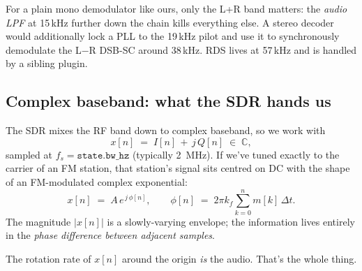 \documentclass[11pt,a4paper]{article}
\begin{document}
For a plain mono demodulator like ours, only the L+R band matters: the
\emph{audio LPF} at 15\,kHz further down the chain kills everything
else.  A stereo decoder would additionally lock a PLL to the 19\,kHz
pilot and use it to synchronously demodulate the L$-$R DSB-SC around
38\,kHz.  RDS lives at 57\,kHz and is handled by a sibling plugin.

\subsection{Complex baseband: what the SDR hands us}

The SDR mixes the RF band down to complex baseband, so we work with
\begin{equation}
x[n] \;=\; I[n] \,+\, j\,Q[n]\;\in\;\mathbb{C},
\end{equation}
sampled at \(f_s = \texttt{state.bw\_hz}\) (typically \SI{2}{MHz}).
If we've tuned exactly to the carrier of an FM station, that station's
signal sits centred on DC with the shape of an FM-modulated complex
exponential:
\begin{equation}
x[n] \;=\; A\,e^{\,j\,\phi[n]},\qquad
\phi[n]\;=\;2\pi k_f\!\!\sum_{k=0}^{n} m[k]\,\Delta t.
\end{equation}
The magnitude \(|x[n]|\) is a slowly-varying envelope; the information
lives entirely in the \emph{phase difference between adjacent samples}.

\begin{center}
\end{center}

The rotation rate of \(x[n]\) around the origin \emph{is} the audio.
That's the whole thing.

\end{document}
